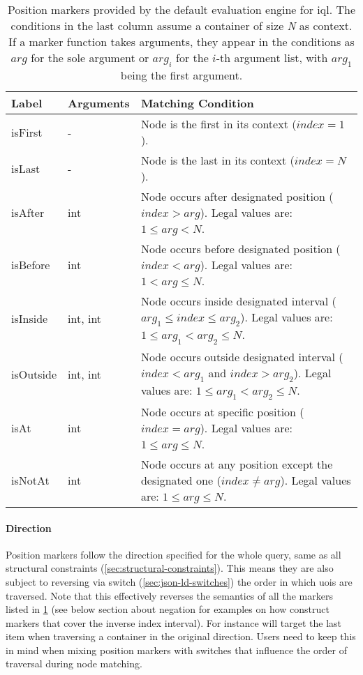 \documentclass[11pt,a4paper]{article}
\begin{document}
\begin{table}[ht]\centering
\begin{tabular}{|p{}|p{}|p{}|}
	\hline 
	\textbf{Label} & \textbf{Arguments} & \textbf{Matching Condition} \\ 
	\hline 
	\hline  
	isFirst & - & Node is the first in its context ($index = 1$). \\ 
	\hline 
	isLast & - & Node is the last in its context ($index = N$). \\  
	\hline 
	isAfter & int & Node occurs after designated position ($index > arg$). Legal values are: $1 \leq arg < N$. \\  
	\hline 
	isBefore & int & Node occurs before designated position ($index < arg$). Legal values are: $1 < arg \leq N$. \\  
	\hline 
	isInside & int, int & Node occurs inside designated interval ($arg_1 \leq index \leq arg_2$). Legal values are: $1 \leq arg_1 < arg_2 \leq N$. \\  
	\hline 
	isOutside & int, int & Node occurs outside designated interval ($index < arg_1$ and $index>arg_2$). Legal values are: $1 \leq arg_1 < arg_2 \leq N$. \\  
	\hline 
	isAt & int & Node occurs at specific position ($index = arg$). Legal values are: $1 \leq arg \leq N$. \\  
	\hline 
	isNotAt & int & Node occurs at any position except the designated one ($index \neq arg$). Legal values are: $1 \leq arg \leq N$. \\  
	\hline 
\end{tabular}
\caption[Global position markers]{Position markers provided by the default evaluation engine for \ac{iql}. The conditions in the last column assume a container of size \textit{N} as context. If a marker function takes arguments, they appear in the conditions as $arg$ for the sole argument or $arg_i$ for the $i$-th argument list, with $arg_1$ being the first argument.}
\label{tab:position-markers}
\end{table} 

\paragraph{Direction}
\noindent Position markers follow the direction specified for the whole query, same as all structural constraints (\ref{sec:structural-constraints}).
This means they are also subject to reversing via switch (\ref{sec:json-ld-switches}) the order in which \acp{uoi} are traversed.
Note that this effectively reverses the semantics of all the markers listed in \cref{tab:position-markers} (see below section about negation for examples on how construct markers that cover the inverse index interval).
For instance  will target the last item when traversing a container in the original direction.
Users need to keep this in mind when mixing position markers with switches that influence the order of traversal during node matching.
\end{document}
